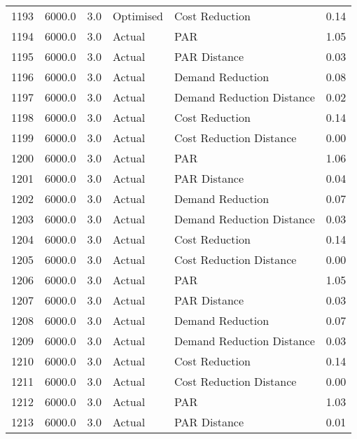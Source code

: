 \begin{longtable}{lrrllr}
1193 &       6000.0 &     3.0 &      Optimised &             Cost Reduction &   0.14 \\
1194 &       6000.0 &     3.0 &         Actual &                        PAR &   1.05 \\
1195 &       6000.0 &     3.0 &         Actual &               PAR Distance &   0.03 \\
1196 &       6000.0 &     3.0 &         Actual &           Demand Reduction &   0.08 \\
1197 &       6000.0 &     3.0 &         Actual &  Demand Reduction Distance &   0.02 \\
1198 &       6000.0 &     3.0 &         Actual &             Cost Reduction &   0.14 \\
1199 &       6000.0 &     3.0 &         Actual &    Cost Reduction Distance &   0.00 \\
1200 &       6000.0 &     3.0 &         Actual &                        PAR &   1.06 \\
1201 &       6000.0 &     3.0 &         Actual &               PAR Distance &   0.04 \\
1202 &       6000.0 &     3.0 &         Actual &           Demand Reduction &   0.07 \\
1203 &       6000.0 &     3.0 &         Actual &  Demand Reduction Distance &   0.03 \\
1204 &       6000.0 &     3.0 &         Actual &             Cost Reduction &   0.14 \\
1205 &       6000.0 &     3.0 &         Actual &    Cost Reduction Distance &   0.00 \\
1206 &       6000.0 &     3.0 &         Actual &                        PAR &   1.05 \\
1207 &       6000.0 &     3.0 &         Actual &               PAR Distance &   0.03 \\
1208 &       6000.0 &     3.0 &         Actual &           Demand Reduction &   0.07 \\
1209 &       6000.0 &     3.0 &         Actual &  Demand Reduction Distance &   0.03 \\
1210 &       6000.0 &     3.0 &         Actual &             Cost Reduction &   0.14 \\
1211 &       6000.0 &     3.0 &         Actual &    Cost Reduction Distance &   0.00 \\
1212 &       6000.0 &     3.0 &         Actual &                        PAR &   1.03 \\
1213 &       6000.0 &     3.0 &         Actual &               PAR Distance &   0.01 \\

\end{longtable}
